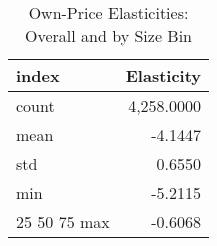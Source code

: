 \begin{table}[!htbp]
\centering
\caption{Own-Price Elasticities: Overall and by Size Bin}
\label{tab:own_elasticities}
\begin{tabular}{lr}
\toprule
index & Elasticity \\
\midrule
count & 4,258.0000 \\
mean & -4.1447 \\
std & 0.6550 \\
min & -5.2115 \\
25%
50%
75%
max & -0.6068 \\
\bottomrule
\end{tabular}

\end{table}
